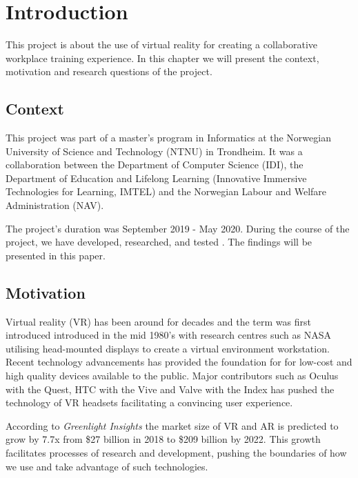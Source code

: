 
\chapter{Introduction}

This project is about the use of virtual reality for creating a collaborative workplace training experience. In this chapter we will present the context, motivation and research questions of the project. 

\section{Context}
This project was part of a master's program in Informatics at the Norwegian University of Science and Technology (NTNU) in Trondheim. It was a collaboration between the Department of Computer Science (IDI), the Department of Education and Lifelong Learning (Innovative Immersive Technologies for Learning, IMTEL) and the Norwegian Labour and Welfare Administration (NAV). 

The project's duration was September 2019 - May 2020. During the course of the project, we have developed, researched, and tested . %
The findings will be presented in this paper.

\section{Motivation}
Virtual reality (VR) has been around for decades and the term was first introduced introduced in the mid 1980's \cite{historyVR} with research centres such as NASA utilising head-mounted displays to create a virtual environment workstation. Recent technology advancements has provided the foundation for for low-cost and high quality devices available to the public. Major contributors such as Oculus with the Quest, HTC with the Vive and Valve with the Index has pushed the technology of VR headsets facilitating a convincing user experience.  

According to \textit{Greenlight Insights} \cite{forcastVR} the market size of VR and AR is predicted to grow by 7.7x from \$27 billion in 2018 to \$209 billion by 2022. This growth facilitates processes of research and development, pushing the boundaries of how we use and take advantage of such technologies.

